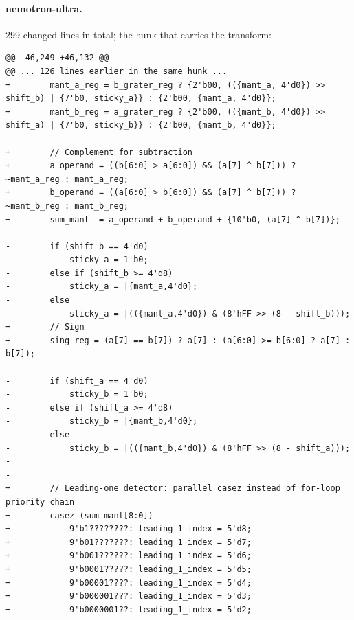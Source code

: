 \paragraph{nemotron-ultra.} 299 changed lines in total; the hunk that carries the transform:
\begin{lstlisting}[style=diff]
@@ -46,249 +46,132 @@
@@ ... 126 lines earlier in the same hunk ...
+        mant_a_reg = b_grater_reg ? {2'b00, (({mant_a, 4'd0}) >> shift_b) | {7'b0, sticky_a}} : {2'b00, {mant_a, 4'd0}};
+        mant_b_reg = a_grater_reg ? {2'b00, (({mant_b, 4'd0}) >> shift_a) | {7'b0, sticky_b}} : {2'b00, {mant_b, 4'd0}};
 
+        // Complement for subtraction
+        a_operand = ((b[6:0] > a[6:0]) && (a[7] ^ b[7])) ? ~mant_a_reg : mant_a_reg;
+        b_operand = ((a[6:0] > b[6:0]) && (a[7] ^ b[7])) ? ~mant_b_reg : mant_b_reg;
+        sum_mant  = a_operand + b_operand + {10'b0, (a[7] ^ b[7])};
 
-        if (shift_b == 4'd0)
-            sticky_a = 1'b0;
-        else if (shift_b >= 4'd8)
-            sticky_a = |{mant_a,4'd0};
-        else
-            sticky_a = |(({mant_a,4'd0}) & (8'hFF >> (8 - shift_b)));
+        // Sign
+        sing_reg = (a[7] == b[7]) ? a[7] : (a[6:0] >= b[6:0] ? a[7] : b[7]);
 
-        if (shift_a == 4'd0)
-            sticky_b = 1'b0;
-        else if (shift_a >= 4'd8)
-            sticky_b = |{mant_b,4'd0};
-        else
-            sticky_b = |(({mant_b,4'd0}) & (8'hFF >> (8 - shift_a)));
-            
-            
+        // Leading-one detector: parallel casez instead of for-loop priority chain
+        casez (sum_mant[8:0])
+            9'b1????????: leading_1_index = 5'd8;
+            9'b01???????: leading_1_index = 5'd7;
+            9'b001??????: leading_1_index = 5'd6;
+            9'b0001?????: leading_1_index = 5'd5;
+            9'b00001????: leading_1_index = 5'd4;
+            9'b000001???: leading_1_index = 5'd3;
+            9'b0000001??: leading_1_index = 5'd2;
\end{lstlisting}
